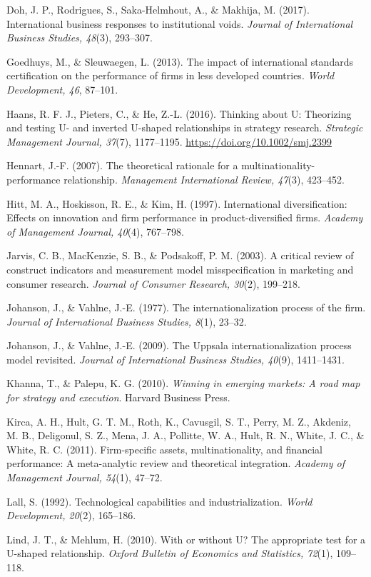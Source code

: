 \documentclass[12pt,a4paper]{article}
\begin{document}
Doh, J. P., Rodrigues, S., Saka-Helmhout, A., \& Makhija, M. (2017).
International business responses to institutional voids. \emph{Journal
of International Business Studies, 48}(3), 293--307.

Goedhuys, M., \& Sleuwaegen, L. (2013). The impact of international
standards certification on the performance of firms in less developed
countries. \emph{World Development, 46}, 87--101.

Haans, R. F. J., Pieters, C., \& He, Z.-L. (2016). Thinking about U:
Theorizing and testing U- and inverted U-shaped relationships in
strategy research. \emph{Strategic Management Journal, 37}(7),
1177--1195. \url{https://doi.org/10.1002/smj.2399}

Hennart, J.-F. (2007). The theoretical rationale for a
multinationality-performance relationship. \emph{Management
International Review, 47}(3), 423--452.

Hitt, M. A., Hoskisson, R. E., \& Kim, H. (1997). International
diversification: Effects on innovation and firm performance in
product-diversified firms. \emph{Academy of Management Journal, 40}(4),
767--798.

Jarvis, C. B., MacKenzie, S. B., \& Podsakoff, P. M. (2003). A critical
review of construct indicators and measurement model misspecification in
marketing and consumer research. \emph{Journal of Consumer Research,
30}(2), 199--218.

Johanson, J., \& Vahlne, J.-E. (1977). The internationalization process
of the firm. \emph{Journal of International Business Studies, 8}(1),
23--32.

Johanson, J., \& Vahlne, J.-E. (2009). The Uppsala internationalization
process model revisited. \emph{Journal of International Business
Studies, 40}(9), 1411--1431.

Khanna, T., \& Palepu, K. G. (2010). \emph{Winning in emerging markets:
A road map for strategy and execution}. Harvard Business Press.

Kirca, A. H., Hult, G. T. M., Roth, K., Cavusgil, S. T., Perry, M. Z.,
Akdeniz, M. B., Deligonul, S. Z., Mena, J. A., Pollitte, W. A., Hult, R.
N., White, J. C., \& White, R. C. (2011). Firm-specific assets,
multinationality, and financial performance: A meta-analytic review and
theoretical integration. \emph{Academy of Management Journal, 54}(1),
47--72.

Lall, S. (1992). Technological capabilities and industrialization.
\emph{World Development, 20}(2), 165--186.

Lind, J. T., \& Mehlum, H. (2010). With or without U? The appropriate
test for a U-shaped relationship. \emph{Oxford Bulletin of Economics and
Statistics, 72}(1), 109--118.
\end{document}
